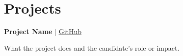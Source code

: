 \vspace{-0.2cm}
\section{Projects}

\begin{onecolentry}
\textbf{Project Name} | \href{https://github.com/example/project}{GitHub}
\begin{highlights}
    \item What the project does and the candidate's role or impact.
\end{highlights}
\end{onecolentry}
